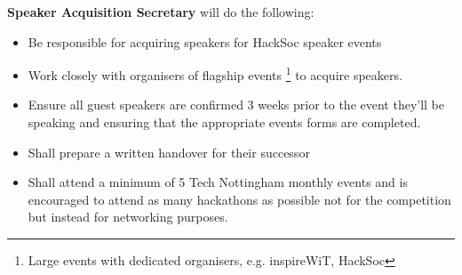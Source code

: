 \item \textbf{Speaker Acquisition Secretary} will do the following:
\begin{itemize}
	\item Be responsible for acquiring speakers for HackSoc speaker events
	\item Work closely with organisers of flagship events \footnote{Large events with dedicated organisers, e.g. inspireWiT, HackSoc} to acquire speakers.
	\item Ensure all guest speakers are confirmed 3 weeks prior to the event they'll be speaking and ensuring that the appropriate events forms are completed.
	\item Shall prepare a written handover for their successor
	\item Shall attend a minimum of 5 Tech Nottingham monthly events and is encouraged to attend as many hackathons as possible not for the competition but instead for networking purposes.
\end{itemize}

